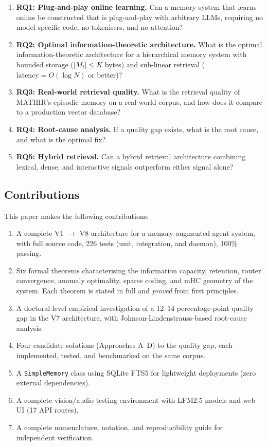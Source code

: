 \documentclass[12pt,a4paper]{article}
\theoremstyle{definition}
\theoremstyle{remark}
\newcommand{\MATHIR}{\textsc{MATHIR}}
\begin{document}
\begin{enumerate}[leftmargin=2cm]
    \item \textbf{RQ1: Plug-and-play online learning.} Can a memory system that learns online be constructed that is plug-and-play with arbitrary LLMs, requiring no model-specific code, no tokenisers, and no attention?
    \item \textbf{RQ2: Optimal information-theoretic architecture.} What is the optimal information-theoretic architecture for a hierarchical memory system with bounded storage ($|M_t| \le K$ bytes) and sub-linear retrieval ($\text{latency} = O(\log N)$ or better)?
    \item \textbf{RQ3: Real-world retrieval quality.} What is the retrieval quality of \MATHIR{}'s episodic memory on a real-world corpus, and how does it compare to a production vector database?
    \item \textbf{RQ4: Root-cause analysis.} If a quality gap exists, what is the root cause, and what is the optimal fix?
    \item \textbf{RQ5: Hybrid retrieval.} Can a hybrid retrieval architecture combining lexical, dense, and interactive signals outperform either signal alone?
\end{enumerate}

\subsection{Contributions}

This paper makes the following contributions:

\begin{enumerate}[leftmargin=2cm]
    \item A complete V1 $\to$ V8 architecture for a memory-augmented agent system, with full source code, 226 tests (unit, integration, and daemon), 100\% passing.
    \item Six formal theorems characterising the information capacity, retention, router convergence, anomaly optimality, sparse coding, and mHC geometry of the system. Each theorem is stated in full and \textit{proved} from first principles.
    \item A doctoral-level empirical investigation of a 12--14 percentage-point quality gap in the V7 architecture, with Johnson-Lindenstrauss-based root-cause analysis.
    \item Four candidate solutions (Approaches A--D) to the quality gap, each implemented, tested, and benchmarked on the same corpus.
    \item A \texttt{SimpleMemory} class using SQLite FTS5 for lightweight deployments (zero external dependencies).
    \item A complete vision/audio testing environment with LFM2.5 models and web UI (17 API routes).
    \item A complete nomenclature, notation, and reproducibility guide for independent verification.
\end{enumerate}
\end{document}

